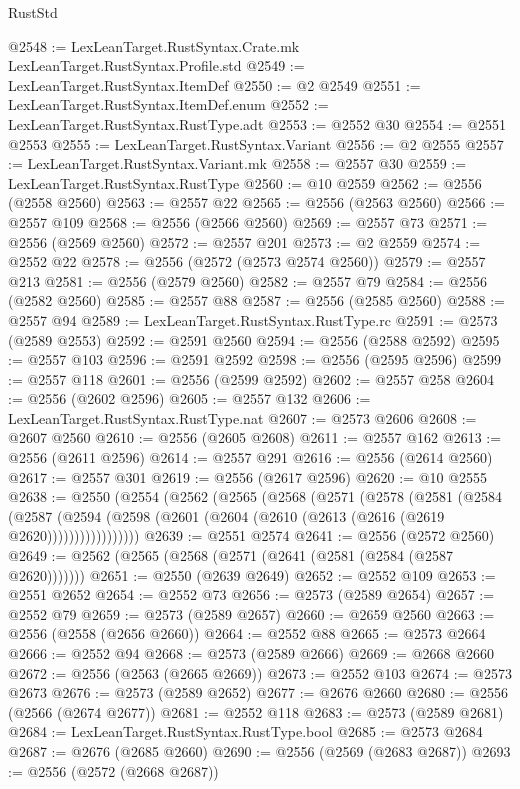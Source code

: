 \begin{lexlean}{RustStd}
\begin{coremodule}
{\begin{coremodule}
{{{{{{{{{{{{{{{{{{{{{{{{{{{{{{{{@2548 := LexLeanTarget.RustSyntax.Crate.mk LexLeanTarget.RustSyntax.Profile.std
@2549 := LexLeanTarget.RustSyntax.ItemDef
@2550 := @2 @2549
@2551 := LexLeanTarget.RustSyntax.ItemDef.enum
@2552 := LexLeanTarget.RustSyntax.RustType.adt
@2553 := @2552 @30
@2554 := @2551 @2553
@2555 := LexLeanTarget.RustSyntax.Variant
@2556 := @2 @2555
@2557 := LexLeanTarget.RustSyntax.Variant.mk
@2558 := @2557 @30
@2559 := LexLeanTarget.RustSyntax.RustType
@2560 := @10 @2559
@2562 := @2556 (@2558 @2560)
@2563 := @2557 @22
@2565 := @2556 (@2563 @2560)
@2566 := @2557 @109
@2568 := @2556 (@2566 @2560)
@2569 := @2557 @73
@2571 := @2556 (@2569 @2560)
@2572 := @2557 @201
@2573 := @2 @2559
@2574 := @2552 @22
@2578 := @2556 (@2572 (@2573 @2574 @2560))
@2579 := @2557 @213
@2581 := @2556 (@2579 @2560)
@2582 := @2557 @79
@2584 := @2556 (@2582 @2560)
@2585 := @2557 @88
@2587 := @2556 (@2585 @2560)
@2588 := @2557 @94
@2589 := LexLeanTarget.RustSyntax.RustType.rc
@2591 := @2573 (@2589 @2553)
@2592 := @2591 @2560
@2594 := @2556 (@2588 @2592)
@2595 := @2557 @103
@2596 := @2591 @2592
@2598 := @2556 (@2595 @2596)
@2599 := @2557 @118
@2601 := @2556 (@2599 @2592)
@2602 := @2557 @258
@2604 := @2556 (@2602 @2596)
@2605 := @2557 @132
@2606 := LexLeanTarget.RustSyntax.RustType.nat
@2607 := @2573 @2606
@2608 := @2607 @2560
@2610 := @2556 (@2605 @2608)
@2611 := @2557 @162
@2613 := @2556 (@2611 @2596)
@2614 := @2557 @291
@2616 := @2556 (@2614 @2560)
@2617 := @2557 @301
@2619 := @2556 (@2617 @2596)
@2620 := @10 @2555
@2638 := @2550
    (@2554
      (@2562
        (@2565
          (@2568
            (@2571
              (@2578
                (@2581
                  (@2584
                    (@2587
                      (@2594 (@2598 (@2601 (@2604 (@2610 (@2613 (@2616 (@2619 @2620)))))))))))))))))
@2639 := @2551 @2574
@2641 := @2556 (@2572 @2560)
@2649 := @2562 (@2565 (@2568 (@2571 (@2641 (@2581 (@2584 (@2587 @2620)))))))
@2651 := @2550 (@2639 @2649)
@2652 := @2552 @109
@2653 := @2551 @2652
@2654 := @2552 @73
@2656 := @2573 (@2589 @2654)
@2657 := @2552 @79
@2659 := @2573 (@2589 @2657)
@2660 := @2659 @2560
@2663 := @2556 (@2558 (@2656 @2660))
@2664 := @2552 @88
@2665 := @2573 @2664
@2666 := @2552 @94
@2668 := @2573 (@2589 @2666)
@2669 := @2668 @2660
@2672 := @2556 (@2563 (@2665 @2669))
@2673 := @2552 @103
@2674 := @2573 @2673
@2676 := @2573 (@2589 @2652)
@2677 := @2676 @2660
@2680 := @2556 (@2566 (@2674 @2677))
@2681 := @2552 @118
@2683 := @2573 (@2589 @2681)
@2684 := LexLeanTarget.RustSyntax.RustType.bool
@2685 := @2573 @2684
@2687 := @2676 (@2685 @2660)
@2690 := @2556 (@2569 (@2683 @2687))
@2693 := @2556 (@2572 (@2668 @2687))
}}}}}}}}}}}}}}}}}}}}}}}}}}}}}}}}
\end{coremodule}}
\end{coremodule}
\end{lexlean}
